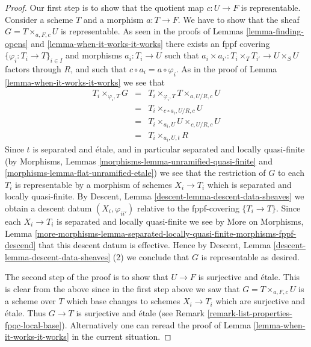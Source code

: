 \begin{proof}
\medskip\noindent
Our first step is to show that the quotient map
$c : U \to F$ is representable.
Consider a scheme $T$ and a morphism $a : T \to F$.
We have to show that the sheaf $G = T \times_{a, F, c} U$
is representable.
As seen in the proofs of Lemmas \ref{lemma-finding-opens} and
\ref{lemma-when-it-works-it-works} there exists an fppf covering
$\{\varphi_i : T_i \to T\}_{i \in I}$ and morphisms $a_i : T_i \to U$
such that $a_i \times a_{i'} : T_i \times_T T_{i'} \to U \times_S U$
factors through $R$, and such that $c \circ a_i = a \circ \varphi_i$.
As in the proof of Lemma \ref{lemma-when-it-works-it-works} we see that
\begin{eqnarray*}
T_i \times_{\varphi_i, T} G & = &
T_i \times_{\varphi_i, T} T \times_{a, U/R, c} U \\
& = & T_i \times_{c \circ a_i, U/R, c} U \\
& = & T_i \times_{a_i, U} U \times_{c, U/R, c} U \\
& = & T_i \times_{a_i, U, t} R
\end{eqnarray*}
Since $t$ is separated and \'etale, and in particular
separated and locally quasi-finite (by Morphisms, Lemmas
\ref{morphisms-lemma-unramified-quasi-finite} and
\ref{morphisms-lemma-flat-unramified-etale})
we see that the restriction
of $G$ to each $T_i$ is representable by a morphism of schemes
$X_i \to T_i$ which is separated and locally quasi-finite. By
Descent, Lemma \ref{descent-lemma-descent-data-sheaves}
we obtain a descent datum $(X_i, \varphi_{ii'})$ relative
to the fppf-covering $\{T_i \to T\}$. Since each
$X_i \to T_i$ is separated and locally quasi-finite we see by
More on Morphisms, Lemma
\ref{more-morphisms-lemma-separated-locally-quasi-finite-morphisms-fppf-descend}
that this descent datum is effective.
Hence by
Descent, Lemma \ref{descent-lemma-descent-data-sheaves} (2)
we conclude that $G$ is representable as desired.

\medskip\noindent
The second step of the proof is to show that $U \to F$ is surjective and
\'etale. This is clear from the above since in the first step above we
saw that $G = T \times_{a, F, c} U$ is a scheme over $T$ which base changes
to schemes $X_i \to T_i$ which are surjective and \'etale. Thus $G \to T$
is surjective and \'etale (see
Remark \ref{remark-list-properties-fpqc-local-base}).
Alternatively one can reread the proof of
Lemma \ref{lemma-when-it-works-it-works} in the current
situation.


\end{proof}
